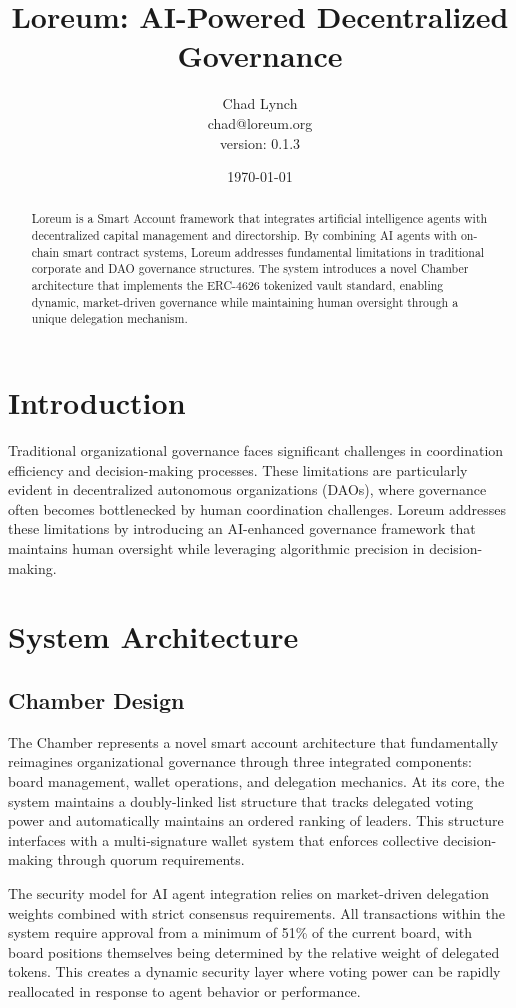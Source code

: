 \documentclass[12pt]{article}
\title{Loreum: AI-Powered Decentralized Governance}
\author{Chad Lynch \\ \small{chad@loreum.org} \\ \small{version: 0.1.3}}
\date{\today}
\begin{document}
\maketitle

\begin{abstract}
Loreum is a Smart Account framework that integrates artificial intelligence agents with decentralized capital management and directorship. By combining AI agents with on-chain smart contract systems, Loreum addresses fundamental limitations in traditional corporate and DAO governance structures. The system introduces a novel Chamber architecture that implements the ERC-4626 tokenized vault standard, enabling dynamic, market-driven governance while maintaining human oversight through a unique delegation mechanism.
\end{abstract}

\section{Introduction}
Traditional organizational governance faces significant challenges in coordination efficiency and decision-making processes. These limitations are particularly evident in decentralized autonomous organizations (DAOs), where governance often becomes bottlenecked by human coordination challenges. Loreum addresses these limitations by introducing an AI-enhanced governance framework that maintains human oversight while leveraging algorithmic precision in decision-making.

\section{System Architecture}

\subsection{Chamber Design}
The Chamber represents a novel smart account architecture that fundamentally reimagines organizational governance through three integrated components: board management, wallet operations, and delegation mechanics. At its core, the system maintains a doubly-linked list structure that tracks delegated voting power and automatically maintains an ordered ranking of leaders. This structure interfaces with a multi-signature wallet system that enforces collective decision-making through quorum requirements.

The security model for AI agent integration relies on market-driven delegation weights combined with strict consensus requirements. All transactions within the system require approval from a minimum of 51\% of the current board, with board positions themselves being determined by the relative weight of delegated tokens. This creates a dynamic security layer where voting power can be rapidly reallocated in response to agent behavior or performance.
\end{document}
